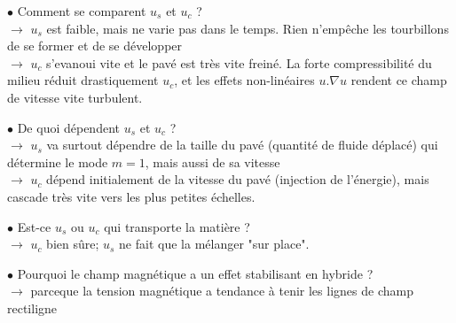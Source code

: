 \documentclass[10pt]{letter}
\begin{document}
$\bullet$ Comment se comparent $u_s$ et $u_c$ ? \\
$\rightarrow$ $u_s$ est faible, mais ne varie pas dans le temps. Rien n'empêche les tourbillons de se former et de se développer \\
$\to$ $u_c$ s'evanoui vite et le pavé est très vite freiné. La forte compressibilité du milieu réduit drastiquement $u_c$, et les effets non-linéaires $u . \nabla u$ rendent ce champ de vitesse vite turbulent.

$\bullet$ De quoi dépendent $u_s$ et $u_c$ ? \\
$\rightarrow$ $u_s$ va surtout dépendre de la taille du pavé (quantité de fluide déplacé) qui détermine le mode $m=1$, mais aussi de sa vitesse \\
$\to$ $u_c$ dépend initialement de la vitesse du pavé (injection de l'énergie), mais cascade très vite vers les plus petites échelles.

$\bullet$ Est-ce $u_s$ ou $u_c$ qui transporte la matière ? \\
$\rightarrow$ $u_c$ bien sûre; $u_s$ ne fait que la mélanger "sur place".

$\bullet$ Pourquoi le champ magnétique a un effet stabilisant en hybride ? \\
$\rightarrow$ parceque la tension magnétique a tendance à tenir les lignes de champ rectiligne

\bigskip
\end{document}

